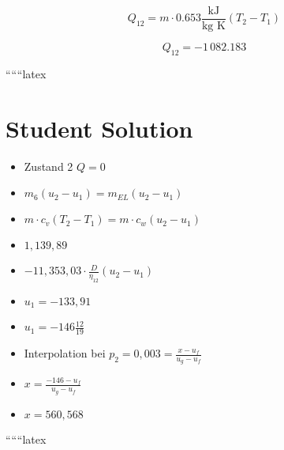 \begin{equation*}
Q_{12} = m \cdot 0.653 \frac{\text{kJ}}{\text{kg K}} (T_{2} - T_{1})
\end{equation*}

\begin{equation*}
Q_{12} = -1 \, 082.183
\end{equation*}

``````latex


\section*{Student Solution}

\begin{itemize}
    \item Zustand 2 $Q = 0$
    \item $m_6 (u_2 - u_1) = m_{EL} (u_2 - u_1)$
    \item $m \cdot c_v (T_2 - T_1) = m \cdot c_w (u_2 - u_1)$
    \item $1,139,89$
    \item $-11,353,03 \cdot \frac{D}{\eta_{12}} (u_2 - u_1)$
    \item $u_1 = -133,91$
    \item $u_1 = -146 \frac{12}{19}$
    \item Interpolation bei $p_2 = 0,003 = \frac{x - u_f}{u_g - u_f}$
    \item $x = \frac{-146 - u_f}{u_g - u_f}$
    \item $x = 560,568$
\end{itemize}

``````latex



